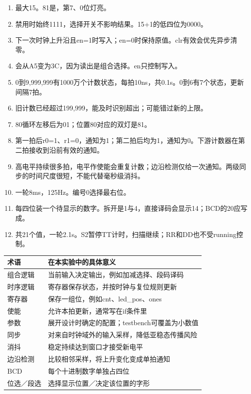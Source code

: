 \begin{enumerate}[label=\arabic*.]
\item 最大15。81是，第7、0位灯亮。
\item 禁用时始终1111，选择开关不影响结果。15+1的低四位为0000。
\item 下一次时钟上升沿且en=1时写入；en=0时保持原值。clr有效会优先异步清零。
\item 会从A5变为3C，因为读出是组合选择。en只控制写入。
\item 0到9,999,999有1000万个计数状态，每拍10ns，共0.1s。0到6有7个状态，更新间隔7拍。
\item 旧计数已经超过199,999，\code{>=}能及时识别超出；\code{==}可能错过新的上限。
\item 80循环左移后为01；位置80对应的双灯是81。
\item 第一拍后r0=1、r1=0，通知为1；第二拍后均为1，通知为0。下游计数器在第二拍接收到沿前有效的通知。
\item 高电平持续很多拍，电平作使能会重复计数；边沿检测仅给一次通知。两级同步的时间尺度很短，不能代替毫秒级消抖。
\item 一轮8ms，125Hz。编号0选择最右位。
\item 每四位装一个待显示的数字。拆开是1与4，直接译码会显示14；BCD的20应写成。
\item 共21个值，一轮2.1s。S2暂停TT计时，扫描继续；RR和DD也不受running控制。
\end{enumerate}

\begin{center}
\begin{tabularx}{\linewidth}{@{}lX@{}}\toprule
术语 & 在本实验中的具体意义\\\midrule
组合逻辑 & 当前输入决定输出，例如加减选择、段码译码\\
时序逻辑 & 寄存器保存状态，并按时钟与复位规则更新\\
寄存器 & 保存一组位，例如cnt、led\_pos、ones\\
使能 & 允许本拍更新，通常写在if条件里\\
参数 & 展开设计时确定的配置；testbench可覆盖为小数值\\
同步 & 对来自时钟域外的输入采样，降低亚稳态传播风险\\
消抖 & 稳定持续达到窗口才接受新电平\\
边沿检测 & 比较相邻采样，将上升变化变成单拍通知\\
BCD & 每个十进制数字单独占四位\\
位选／段选 & 选择显示位置／决定该位置的字形\\\bottomrule
\end{tabularx}
\end{center}

